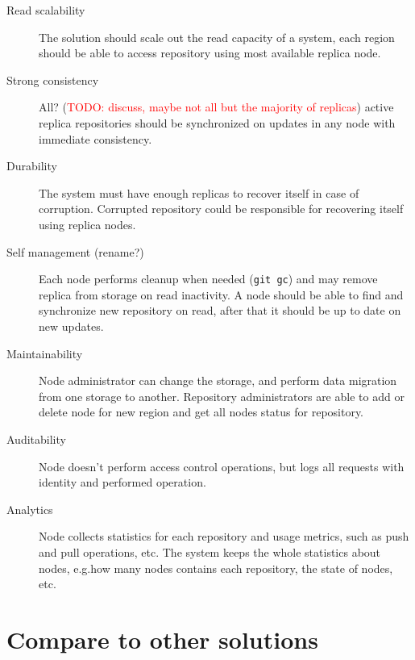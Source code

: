\documentclass[acmlarge, screen, nonacm, 11pt]{acmart}
\newcommand{\code}[1]{\texttt{#1}}
\newcommand{\todo}[1]{\textcolor{red}{TODO: #1}}
\begin{document}
\begin{description}
  \item[Read scalability]
    The solution should scale out the read capacity of a system, each region should be able
    to access repository using most available replica node.
  \item[Strong consistency]
    All? (\todo{discuss, maybe not all but the majority of replicas})
    active replica repositories should be synchronized on updates in any node
    with immediate consistency.
  \item[Durability]
    The system must have enough replicas to recover itself in case of corruption.
    Corrupted repository could be responsible for recovering itself using replica nodes.
  \item[Self management (rename?)]
    Each node performs cleanup when needed (\code{git gc}) and may remove replica
    from storage on read inactivity.
    A node should be able to find and synchronize new repository on read,
    after that it should be up to date on new updates.
  \item[Maintainability]
    Node administrator can change the storage, and perform data migration from one storage
    to another.
    Repository administrators are able to add or delete node for new region and
    get all nodes status for repository.
  \item[Auditability]
    Node doesn't perform access control operations, but logs all
    requests with identity and performed operation.
  \item[Analytics]
    Node collects statistics for each repository and usage metrics, such as
    push and pull operations, etc. The system keeps the whole statistics about
    nodes, e.g.\@ how many nodes contains each repository, the state of nodes, etc.
\end{description}

\section{Compare to other solutions}
\end{document}
